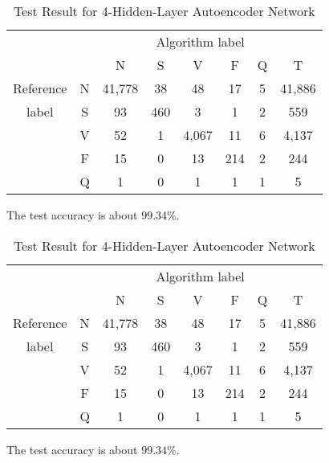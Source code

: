 \documentclass[journal]{IEEEtran}
\begin{document}
\lipsum[1]

\begin{table}[!htbp]
\begin{center}
\begin{threeparttable}
\caption{Test Result for 4-Hidden-Layer Autoencoder Network}
\label{table7}
\begin{tabular}{cccccccc}
\hline
\multicolumn{6}{r}{Algorithm label} \\
\cline{3-7}
		&  & N & S      & V    & F     & Q   & T\\
\hline
 Reference & N & 41,778 &  38  &  48   & 17  & 5  &  41,886 \\
	label  & S &  93    & 460  &   3   & 1   & 2  &  559\\
		   & V &  52    & 1    & 4,067 & 11  & 6  &  4,137\\
		   & F &  15    & 0    & 13    & 214 & 2  &  244\\
		   & Q &  1     & 0    & 1     & 1   & 1  &  5\\
\hline
\end{tabular}
\begin{tablenotes}
\item The test accuracy is about $99.34\%$.
\end{tablenotes}
\end{threeparttable}
\end{center}
\end{table}

\lipsum[1]
\begin{table}[!htbp]
\begin{center}
\begin{threeparttable}
\caption{Test Result for 4-Hidden-Layer Autoencoder Network}
\label{table7}
\begin{tabular}{cccccccc}
\hline
\multicolumn{6}{r}{Algorithm label} \\
\cline{3-7}
		&  & N & S      & V    & F     & Q   & T\\
\hline
 Reference & N & 41,778 &  38  &  48   & 17  & 5  &  41,886 \\
	label  & S &  93    & 460  &   3   & 1   & 2  &  559\\
		   & V &  52    & 1    & 4,067 & 11  & 6  &  4,137\\
		   & F &  15    & 0    & 13    & 214 & 2  &  244\\
		   & Q &  1     & 0    & 1     & 1   & 1  &  5\\
\hline
\end{tabular}
\begin{tablenotes}
\item The test accuracy is about $99.34\%$.
\end{tablenotes}
\end{threeparttable}
\end{center}
\end{table}
\lipsum[1]
\end{document}

